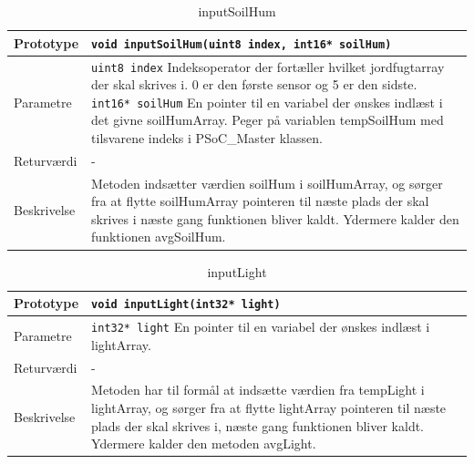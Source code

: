 \clearpage


\begin{table}[h]
\begin{tabularx}{\textwidth}{| L{2.5 cm} | Z |} \hline
Prototype & \texttt{void inputSoilHum(uint8 index, int16* soilHum)} \\\hline
Parametre & \texttt{uint8 index} \newline
Indeksoperator der fortæller hvilket jordfugtarray der skal skrives i. 0 er den første sensor og 5 er den sidste. \newline
\texttt{int16* soilHum} \newline
En pointer til en variabel der ønskes indlæst i det givne soilHumArray. Peger på variablen tempSoilHum med tilsvarene indeks i PSoC\_Master klassen. \\\hline
Returværdi & - \\\hline
Beskrivelse & Metoden indsætter værdien soilHum i soilHumArray, og sørger fra at flytte soilHumArray pointeren til næste plads der skal skrives i næste gang funktionen bliver kaldt. Ydermere kalder den funktionen avgSoilHum. \\\hline
\end{tabularx}
\caption{inputSoilHum}
\label{table:inputSoilHum}
\end{table}


\begin{table}[h]
\begin{tabularx}{\textwidth}{| L{2.5 cm} | Z |} \hline
Prototype & \texttt{void inputLight(int32* light)} \\\hline
Parametre & \texttt{int32* light} \newline
En pointer til en variabel der ønskes indlæst i lightArray. \\\hline
Returværdi & - \\\hline
Beskrivelse & Metoden har til formål at indsætte værdien fra tempLight i lightArray, og sørger fra at flytte lightArray pointeren til næste plads der skal skrives i, næste gang funktionen bliver kaldt. Ydermere kalder den metoden avgLight.  \\\hline
\end{tabularx}
\caption{inputLight}
\label{table:inputLight}
\end{table}

\clearpage


